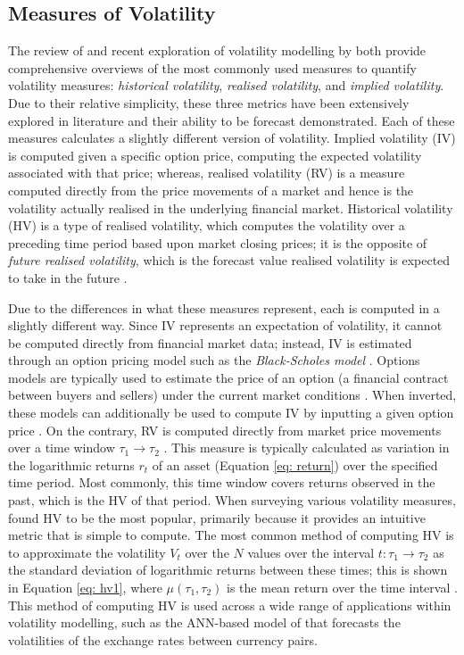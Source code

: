 \documentclass[a4paper, 11pt]{report}
\begin{document}
    \subsection{Measures of Volatility}

    The review of \citet{ge-2022} and recent exploration of volatility modelling by \citet{tino-2001} both provide comprehensive overviews of the most commonly used measures to quantify volatility measures: \emph{historical volatility}, \emph{realised volatility}, and \emph{implied volatility}. Due to their relative simplicity, these three metrics have been extensively explored in literature and their ability to be forecast demonstrated. Each of these measures calculates a slightly different version of volatility. Implied volatility (IV) is computed given a specific option price, computing the expected volatility associated with that price; whereas, realised volatility (RV) is a measure computed directly from the price movements of a market and hence is the volatility actually realised in the underlying financial market. Historical volatility (HV) is a type of realised volatility, which computes the volatility over a preceding time period based upon market closing prices; it is the opposite of \emph{future realised volatility}, which is the forecast value realised volatility is expected to take in the future \citep{busch-2011}.

    Due to the differences in what these measures represent, each is computed in a slightly different way. Since IV represents an expectation of volatility, it cannot be computed directly from financial market data; instead, IV is estimated through an option pricing model such as the \emph{Black-Scholes model} \citep{black-1973}. Options models are typically used to estimate the price of an option (a financial contract between buyers and sellers) under the current market conditions \citep{wu-2015}. When inverted, these models can additionally be used to compute IV by inputting a given option price \citep{tino-2001}. On the contrary, RV is computed directly from market price movements over a time window $\tau_1 \to \tau_2$ \citep{ge-2022}. This measure is typically calculated as variation in the logarithmic returns $r_t$ of an asset (Equation \ref{eq: return}) over the specified time period. Most commonly, this time window covers returns observed in the past, which is the HV of that period. When surveying various volatility measures, \citet{ge-2022} found HV to be the most popular, primarily because it provides an intuitive metric that is simple to compute. The most common method of computing HV is to approximate the volatility $V_t$ over the $N$ values over the interval $t \colon \tau_1 \to \tau_2$ as the standard deviation of logarithmic returns between these times; this is shown in Equation \ref{eq: hv1}, where $\mu(\tau_1, \tau_2)$ is the mean return over the time interval \citep{ge-2022}. This method of computing HV is used across a wide range of applications within volatility modelling, such as the ANN-based model of \citet{lahmiri-2017} that forecasts the volatilities of the exchange rates between currency pairs.
\end{document}
